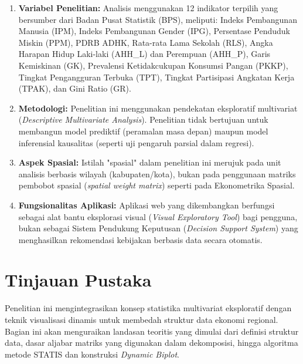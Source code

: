 \documentclass[a4paper]{article}
\theoremstyle{definition} %
\begin{document}
\begin{enumerate}
    \item \textbf{Variabel Penelitian:} Analisis menggunakan 12 indikator terpilih yang bersumber dari Badan Pusat Statistik (BPS), meliputi: Indeks Pembangunan Manusia (IPM), Indeks Pembangunan Gender (IPG), Persentase Penduduk Miskin (PPM), PDRB ADHK, Rata-rata Lama Sekolah (RLS), Angka Harapan Hidup Laki-laki (AHH\_L) dan Perempuan (AHH\_P), Garis Kemiskinan (GK), Prevalensi Ketidakcukupan Konsumsi Pangan (PKKP), Tingkat Pengangguran Terbuka (TPT), Tingkat Partisipasi Angkatan Kerja (TPAK), dan Gini Ratio (GR).
    \item \textbf{Metodologi:} Penelitian ini menggunakan pendekatan eksploratif multivariat (\textit{Descriptive Multivariate Analysis}). Penelitian tidak bertujuan untuk membangun model prediktif (peramalan masa depan) maupun model inferensial kausalitas (seperti uji pengaruh parsial dalam regresi).
    \item \textbf{Aspek Spasial:} Istilah "spasial" dalam penelitian ini merujuk pada unit analisis berbasis wilayah (kabupaten/kota), bukan pada penggunaan matriks pembobot spasial (\textit{spatial weight matrix}) seperti pada Ekonometrika Spasial.
    \item \textbf{Fungsionalitas Aplikasi:} Aplikasi web yang dikembangkan berfungsi sebagai alat bantu eksplorasi visual (\textit{Visual Exploratory Tool}) bagi pengguna, bukan sebagai Sistem Pendukung Keputusan (\textit{Decision Support System}) yang menghasilkan rekomendasi kebijakan berbasis data secara otomatis.
\end{enumerate}

\newpage
\section{Tinjauan Pustaka}

Penelitian ini mengintegrasikan konsep statistika multivariat eksploratif dengan teknik visualisasi dinamis untuk membedah struktur data ekonomi regional. Bagian ini akan menguraikan landasan teoritis yang dimulai dari definisi struktur data, dasar aljabar matriks yang digunakan dalam dekomposisi, hingga algoritma metode STATIS dan konstruksi \textit{Dynamic Biplot}.
\end{document}
